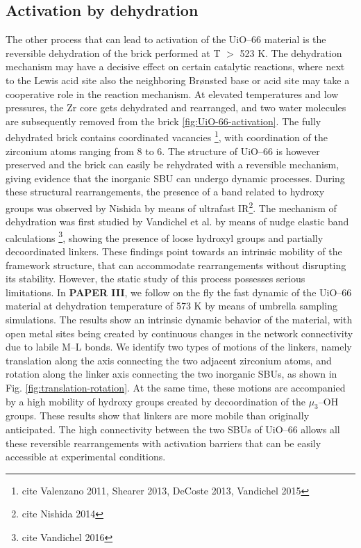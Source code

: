 \subsection{Activation by dehydration}
The other process that can lead to activation of the UiO--66 material is the reversible dehydration of the brick performed at T $>$ 523 K.  The dehydration mechanism may have a decisive effect on certain catalytic reactions, where next to the Lewis acid site also the neighboring Br\o{}nsted base or acid site may take a cooperative role in the reaction mechanism. At elevated temperatures and low pressures, the Zr core gets dehydrated and rearranged, and two water molecules are subsequently removed from the brick \ref{fig:UiO-66-activation}. The fully dehydrated  brick contains coordinated vacancies \footnote{cite Valenzano 2011, Shearer 2013, DeCoste 2013, Vandichel 2015}, with coordination of the zirconium atoms ranging from 8 to 6. The structure of UiO--66 is however preserved and the brick can easily be rehydrated with a reversible mechanism, giving evidence that the inorganic SBU can undergo dynamic processes. During these structural rearrangements, the presence of a band related to hydroxy groups was observed by Nishida by means of ultrafast IR\footnote{cite Nishida 2014}. The mechanism of dehydration was first studied by Vandichel et al. by means of nudge elastic band calculations \footnote{cite Vandichel 2016}, showing the presence of loose hydroxyl groups and partially decoordinated linkers. These findings point towards an intrinsic mobility of the framework structure, that can accommodate rearrangements without disrupting its stability. However, the static study of this process possesses serious limitations. In \textbf{PAPER III}, we follow on the fly the fast dynamic of the UiO--66 material at dehydration temperature of 573 K by means of umbrella sampling simulations.  The results show an intrinsic dynamic behavior of the material, with open metal sites being created by continuous changes in the network connectivity due to labile M--L bonds. We identify two types of motions of the linkers, namely translation along the axis connecting the two adjacent zirconium atoms, and rotation along the linker axis connecting the two inorganic SBUs, as shown in Fig. \ref{fig:translation-rotation}. At the same time, these motions are accompanied by a high mobility of hydroxy groups created by decoordination of the $\mu_3$--OH groups. These results show that linkers are more mobile than originally anticipated. The high connectivity between the two SBUs of UiO--66 allows all these reversible rearrangements with activation barriers that can be easily accessible at experimental conditions. 

